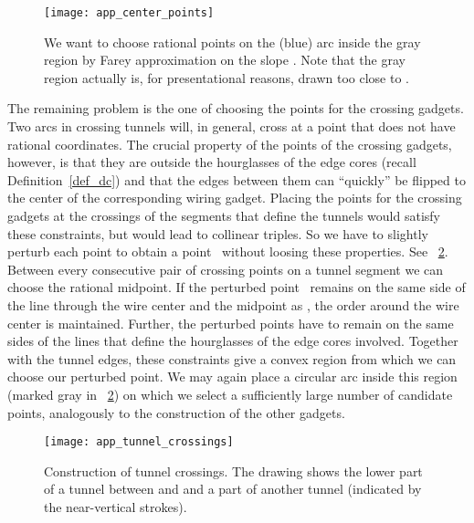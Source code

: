\documentclass[11pt,a4paper]{article}
\begin{document}
\begin{figure}
\centering
\texttt{[image: app\_center\_points]}
\caption{We want to choose rational points on the (blue) arc inside the gray region by Farey approximation on the slope .
Note that the gray region actually is, for presentational reasons, drawn too close to .}
\label{fig_app_center_points}
\end{figure}


The remaining problem is the one of choosing the points for the crossing gadgets.
Two arcs in crossing tunnels will, in general, cross at a point that does not have rational coordinates.
The crucial property of the points of the crossing gadgets, however, is that they are outside the hourglasses of the edge cores (recall Definition~\ref{def_dc}) and that the edges between them can ``quickly'' be flipped to the center of the corresponding wiring gadget.
Placing the points for the crossing gadgets at the crossings of the segments that define the tunnels would satisfy these constraints, but would lead to collinear triples.
So we have to slightly perturb each point  to obtain a point~ without loosing these properties.
See \figurename~\ref{fig_app_tunnel_crossings}.
Between every consecutive pair of crossing points on a tunnel segment  we can choose the rational midpoint.
If the perturbed point~ remains on the same side of the line through the wire center and the midpoint as , the order around the wire center is maintained.
Further, the perturbed points have to remain on the same sides of the lines that define the hourglasses of the edge cores involved.
Together with the tunnel edges, these constraints give a convex region from which we can choose our perturbed point.
We may again place a circular arc inside this region (marked gray in \figurename~\ref{fig_app_tunnel_crossings}) on which we select a sufficiently large number of candidate points, analogously to the construction of the other gadgets.

\begin{figure}
\centering
\texttt{[image: app\_tunnel\_crossings]}
\caption{Construction of tunnel crossings. The drawing shows the lower part of a tunnel between  and  and a part of another tunnel (indicated by the near-vertical strokes).}
\label{fig_app_tunnel_crossings}
\end{figure}
\end{document}
